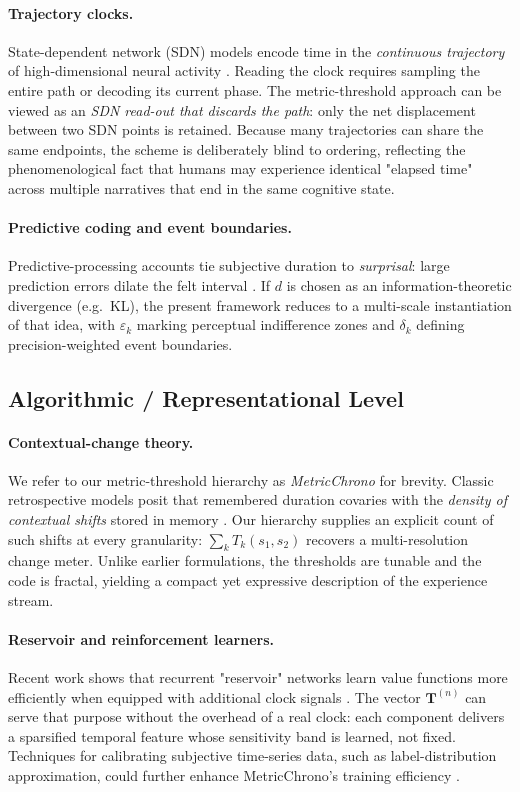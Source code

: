 \documentclass[11pt]{article}
\begin{document}
\paragraph{Trajectory clocks.}
State-dependent network (SDN) models encode time in the
\emph{continuous trajectory} of high-dimensional neural activity
\citep{buonomano2009}.  Reading the clock requires sampling the entire
path or decoding its current phase.  The metric-threshold approach can
be viewed as an \emph{SDN read-out that discards the path}: only the
net displacement between two SDN points is retained.  Because many
trajectories can share the same endpoints, the scheme is deliberately
blind to ordering, reflecting the phenomenological fact that humans may
experience identical "elapsed time" across multiple narratives that
end in the same cognitive state.

\paragraph{Predictive coding and event boundaries.}
Predictive-processing accounts tie subjective duration to
\emph{surprisal}: large prediction errors dilate the felt interval
\citep{friston2010free,zacks2007event}.  If $d$ is chosen as an
information-theoretic divergence (e.g.\ KL), the present framework
reduces to a multi-scale instantiation of that idea, with $\varepsilon_k$
marking perceptual indifference zones and $\delta_k$ defining
precision-weighted event boundaries.

\subsection{Algorithmic / Representational Level}
\paragraph{Contextual-change theory.}
We refer to our metric-threshold hierarchy as \emph{MetricChrono} for brevity.
Classic retrospective models posit that remembered duration covaries
with the \emph{density of contextual shifts} stored in memory
\citep{block1990distinguishing}.  Our hierarchy supplies an explicit
count of such shifts at every granularity:
$\sum_k T_k(s_1,s_2)$ recovers a multi-resolution change
meter.  Unlike earlier formulations, the thresholds are tunable and the
code is fractal, yielding a compact yet expressive description of the
experience stream.

\paragraph{Reservoir and reinforcement learners.}
Recent work shows that recurrent "reservoir" networks learn value
functions more efficiently when equipped with additional clock signals
\citep{merchant2013neurophysiology}. The vector
$\mathbf T^{(n)}$ can serve that purpose without the overhead of a real
clock: each component delivers a sparsified temporal feature whose
sensitivity band is learned, not fixed. Techniques for calibrating
subjective time-series data, such as label-distribution approximation,
could further enhance MetricChrono's training efficiency \citep{Liang2023}.
\end{document}
